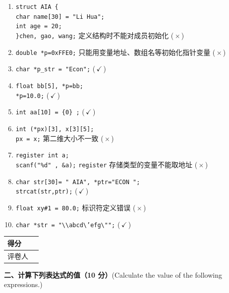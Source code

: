 \documentclass[a4paper,11pt]{ctexart}
\newcommand{\ansmark}[1]{\hfill(\,\textcolor{ansred}{\textbf{#1}}\,)}
\newcommand{\secbox}[2]{%
  \noindent\begin{tabular}{|>{\centering\arraybackslash}m{1.5cm}|>{\centering\arraybackslash}m{1.5cm}|}
    \hline
    得\quad 分 & \\ \hline
    评卷人 & \\ \hline
  \end{tabular}\hspace{0.8em}%
  \begin{minipage}[c]{\dimexpr\textwidth-4.2cm\relax}
    \textbf{#1}#2
  \end{minipage}\par\vspace{0.5em}%
}
\begin{document}
\begin{enumerate}[label=(\arabic*), leftmargin=2.4em, itemsep=4pt]
  \item \texttt{struct AIA \{}\\
        \hspace*{1.5em}\texttt{char name[30] = "Li Hua";}\\
        \hspace*{1.5em}\texttt{int age = 20;}\\
        \texttt{\}chen, gao, wang;} \hfill \textcolor{noteblue}{\small 定义结构时不能对成员初始化} \quad (\,\textcolor{ansred}{$\times$}\,)
  \item \texttt{double *p=0xFFE0;} \hfill \textcolor{noteblue}{\small 只能用变量地址、数组名等初始化指针变量} \quad (\,\textcolor{ansred}{$\times$}\,)
  \item \texttt{char *p\_str = "Econ";} \ansmark{$\checkmark$}
  \item \texttt{float bb[5], *p=bb;}\\
        \texttt{*p=10.0;} \ansmark{$\checkmark$}
  \item \texttt{int aa[10] = \{0\} ;} \ansmark{$\checkmark$}
  \item \texttt{int (*px)[3], x[3][5];}\\
        \texttt{px = x;} \hfill \textcolor{noteblue}{\small 第二维大小不一致} \quad (\,\textcolor{ansred}{$\times$}\,)
  \item \texttt{register int a;}\\
        \texttt{scanf("\%d" , \&a);} \hfill \textcolor{noteblue}{\small \texttt{register} 存储类型的变量不能取地址} \quad (\,\textcolor{ansred}{$\times$}\,)
  \item \texttt{char str[30]= " AIA", *ptr="ECON ";}\\
        \texttt{strcat(str,ptr);} \ansmark{$\checkmark$}
  \item \texttt{float xy\#1 = 80.0;} \hfill \textcolor{noteblue}{\small 标识符定义错误} \quad (\,\textcolor{ansred}{$\times$}\,)
  \item \texttt{char *str = "\textbackslash\textbackslash abcd\textbackslash'efg\textbackslash"";} \ansmark{$\checkmark$}
\end{enumerate}

\vspace{8pt}

\secbox{二、计算下列表达式的值（10 分）}{{\small (Calculate the value of the following expressions.)}}
\end{document}
